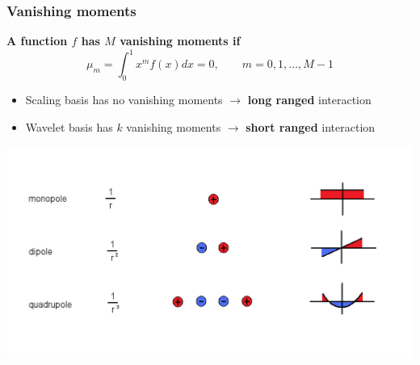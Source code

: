 \begin{frame}
    \frametitle{Vanishing moments}
    \scriptsize
    \centering
    \textbf{A function $f$ has $M$ vanishing moments if}
    \begin{equation}
        \nonumber
        \mu_m = \int_0^1 x^m f(x) dx = 0,\qquad m = 0, 1, \dots, M - 1
    \end{equation}
    \vspace{2mm}
    \begin{itemize}
        \item   Scaling basis has no vanishing moments $\longrightarrow$ 
		\textbf{long ranged} interaction
        \item   Wavelet basis has $k$ vanishing moments $\longrightarrow$ 
		\textbf{short ranged} interaction
    \end{itemize}
    \vspace{2mm}
    \includegraphics[scale=0.4, clip, viewport = 0 50 680 350]{figures/multipoles.pdf}
\end{frame}

